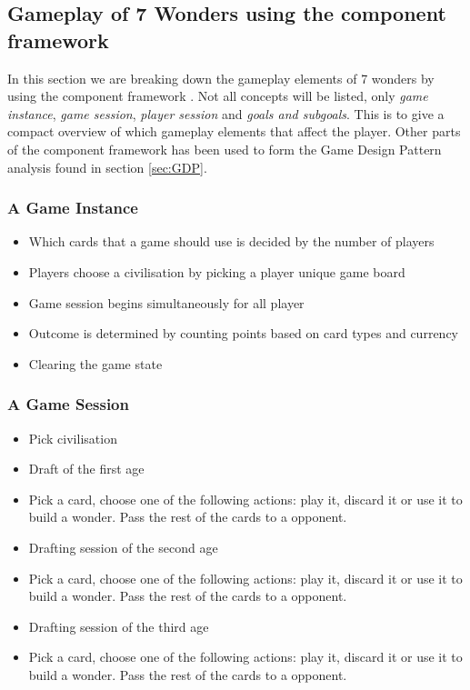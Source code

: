 \documentclass[a4paper]{article}
\begin{document}
\subsection{Gameplay of 7 Wonders using the component framework}
\label{sec:gpCompFrame7wond}
In this section we are breaking down the gameplay elements of 7 wonders by using the component framework \cite{bjork2003describing}. 
Not all concepts will be listed, only \textit{game instance}, \textit{game session}, \textit{player session} and \textit{goals and subgoals}. 
This is to give a compact overview of which gameplay elements that affect the player. Other parts of the component framework has been used to form the Game Design Pattern analysis found in section \ref{sec:GDP}.

\subsubsection{A Game Instance}
\begin{itemize}[noitemsep,topsep=0pt,parsep=0pt,partopsep=0pt]
  \item Which cards that a game should use is decided by the number of players
  \item Players choose a civilisation by picking a player unique game board
  \item Game session begins simultaneously for all player 
  \item Outcome is determined by counting points based on card types and currency
  \item Clearing the game state
\end{itemize}

\subsubsection{A Game Session}
\begin{itemize}[noitemsep,topsep=0pt,parsep=0pt,partopsep=0pt]
  \item Pick civilisation
  \item Draft of the first age
  \item Pick a card, choose one of the following actions: play it, discard it or use it to build a wonder. Pass the rest of the cards to a opponent.
  \item Drafting session of the second age
  \item Pick a card, choose one of the following actions: play it, discard it or use it to build a wonder. Pass the rest of the cards to a opponent.
  \item Drafting session of the third age
  \item Pick a card, choose one of the following actions: play it, discard it or use it to build a wonder. Pass the rest of the cards to a opponent.
\end{itemize}
\end{document}
